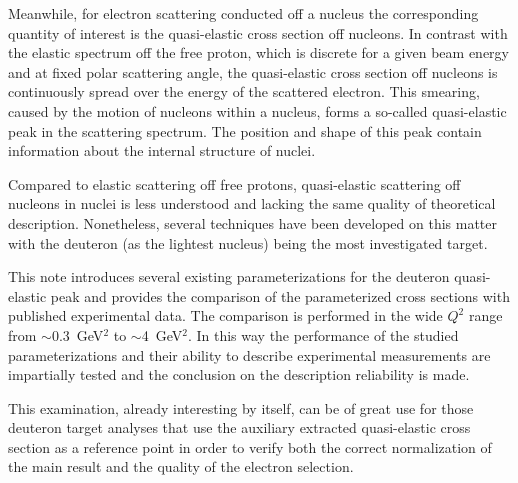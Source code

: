 Meanwhile, for electron scattering conducted off a nucleus the corresponding quantity of interest is the quasi-elastic cross section off nucleons. In contrast with the elastic spectrum off the free proton, which is discrete for a given beam energy and at fixed polar scattering angle, the quasi-elastic cross section off nucleons is continuously spread over the energy of the scattered electron. This smearing, caused by the motion of nucleons within a nucleus, forms a so-called quasi-elastic peak in the scattering spectrum. The position and shape of this peak contain information about the internal structure of nuclei.

Compared to elastic scattering off free protons, quasi-elastic scattering off nucleons in nuclei is less understood and lacking the same quality of theoretical description. Nonetheless, several techniques have been developed on this matter with the deuteron (as the lightest nucleus) being the most investigated target. 

This note introduces several existing parameterizations for the deuteron quasi-elastic peak and provides the comparison of the parameterized cross sections with published experimental data. The comparison is performed in the wide $Q^{2}$ range from $\sim$0.3~GeV$^{2}$ to $\sim$4~GeV$^{2}$. In this way the performance of the studied parameterizations and their ability to describe experimental measurements are impartially tested and the conclusion on the description reliability is made.


This examination, already interesting by itself, can be of great use for those deuteron target analyses that use the auxiliary extracted quasi-elastic cross section as a reference point in order to verify both the correct normalization of the main result and the quality of the electron selection.




